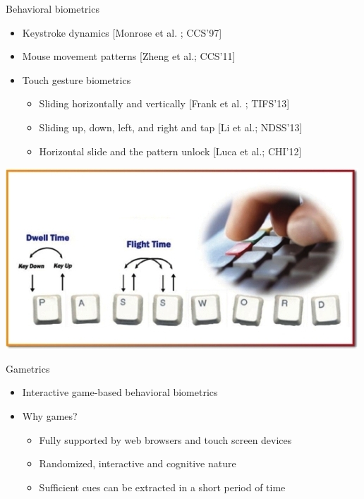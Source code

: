 \begin{frame}{Behavioral biometrics}




\begin{itemize}
\item Keystroke dynamics \hfill {\footnotesize{[Monrose et al. ; CCS'97]}}
\item Mouse movement patterns \hfill {\footnotesize{[Zheng et al.; CCS'11]}}
\item Touch gesture biometrics
\begin{itemize}
\item Sliding horizontally and vertically \hfill {\footnotesize{[Frank et al. ; TIFS'13]}}
\item Sliding up, down, left,  and right and tap \hfill {\footnotesize{[Li et al.; NDSS'13]}}
\item Horizontal slide and the pattern unlock  \hfill {\footnotesize{[Luca et al.; CHI'12]}}
\end{itemize}
\end{itemize}


\begin{center}
\includegraphics[width=0.3\linewidth]{Figures/bio2}
\end{center}
\end{frame}




\begin{frame}{Gametrics}


\begin{itemize}

\item Interactive game-based behavioral biometrics

\item Why games?

\begin{itemize}
	\item Fully supported by web browsers and touch screen devices
	\item Randomized, interactive and cognitive nature
	\item Sufficient cues can be extracted in a short period of time 
	
\end{itemize}

\end{itemize}

\end{frame}







